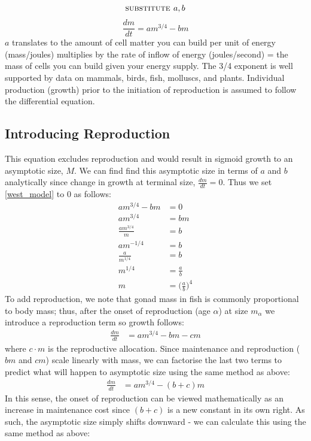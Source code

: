 \documentclass[a4paper]{article} %
\begin{document}
\begin{align*}
    \textsc{substitute }a, b
\end{align*}
\begin{equation}
    \frac{dm}{dt} = am^{3/4} - bm \label{west_model}
\end{equation}
$a$ translates to the amount of cell matter you can build per unit of energy (mass/joules) multiplies by the rate of inflow of energy (joules/second) = the mass of cells you can build given your energy supply. The 3/4 exponent is well supported by data on mammals, birds, fish, molluscs, and plants. Individual production (growth) prior to the initiation of reproduction is assumed to follow the differential equation.

\subsection{Introducing Reproduction}
This equation excludes reproduction and would result in sigmoid growth to an asymptotic size, $M$. We can find find this asymptotic size in terms of $a$ and $b$ analytically since change in growth at terminal size, $\frac{dm}{dt} = 0$. Thus we set \eqref{west_model} to 0 as follows:
\begin{align*}
    am^{3/4} - bm &= 0 \\
    am^{3/4} &= bm \\
    \frac{am^{3/4}}{m} &= b \\
    am^{-1/4} &= b \\
    \frac{a}{m^{1/4}} &= b \\
    m^{1/4} &= \frac{a}{b} \\
    m &= \Big(\frac{a}{b}\Big)^4
\end{align*}
To add reproduction, we note that gonad mass in fish is commonly proportional to body mass; thus, after the onset of reproduction (age $\alpha$) at size $m_{\alpha}$ we introduce a reproduction term so growth follows:
\begin{align*}
    \frac{dm}{dt} &= am^{3/4} - bm - cm
\end{align*}
where $c \cdot m$ is the reproductive allocation. Since maintenance and reproduction ($bm$ and $cm$) scale linearly with mass, we can factorise the last two terms to predict what will happen to asymptotic size using the same method as above:
\begin{align*}
    \frac{dm}{dt} &= am^{3/4} - (b+c)m
\end{align*}
In this sense, the onset of reproduction can be viewed mathematically as an increase in maintenance cost since $(b+c)$ is a new constant in its own right. As such, the asymptotic size simply shifts downward - we can calculate this using the same method as above:
\end{document}
